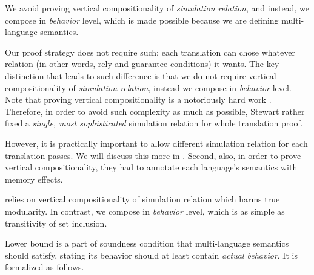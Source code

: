 {We avoid proving vertical compositionality of \textit{simulation relation}, and instead, we compose in \textit{behavior} level, which is made possible because we are defining multi-language semantics.




Our proof strategy does not require such; each translation can chose whatever relation (in other words, rely and guarantee conditions) it wants.
The key distinction that leads to such difference is that we do not require vertical compositionality of \textit{simulation relation}, instead we compose in \textit{behavior} level.
Note that proving vertical compositionality is a notoriously hard work \cite{TODO}. %
Therefore, in order to avoid such complexity as much as possible, Stewart \etal{} rather fixed a \textit{single, most sophisticated} simulation relation for whole translation proof.

However, it is practically important to allow different simulation relation for each translation passes.
We will discuss this more in \cite{sec:overview:proof}.
Second, also, in order to prove vertical compositionality, they had to annotate each language's semantics with memory effects.


\ccc{} relies on vertical compositionality of simulation relation which harms true modularity.
In contrast, we compose in \textit{behavior} level, which is as simple as transitivity of set inclusion.








Lower bound is a part of soundness condition that multi-language semantics should satisfy, stating its behavior should at least contain \textit{actual behavior}.
It is formalized as follows.

}
